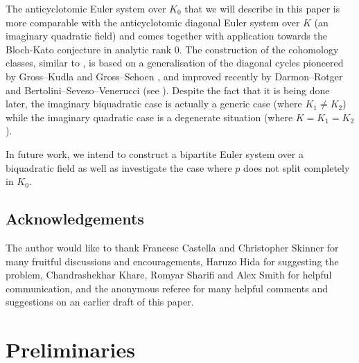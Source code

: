 \documentclass[10pt,letterpaper]{amsart}
\theoremstyle{plain}
\theoremstyle{definition}
\theoremstyle{definition}
\theoremstyle{plain}
\theoremstyle{plain}
\theoremstyle{plain}
\theoremstyle{remark}
\numberwithin{equation}{section}
\begin{document}
{The anticyclotomic Euler system over $K_0$ that we will describe in this paper is more comparable with the anticyclotomic diagonal Euler system \cite{Do-PhD,CD} over $K$ (an imaginary quadratic field) and comes together with application towards the Bloch-Kato conjecture in analytic rank $0$. The construction of the cohomology classes, similar to \cite{Do-PhD,CD}, is based on a generalisation of the diagonal cycles pioneered by Gross--Kudla \cite{gross-kudla} and Gross--Schoen \cite{gross-schoen}, and improved recently by Darmon--Rotger and Bertolini--Seveso--Venerucci (see \cite{BDRSV}). Despite the fact that it is being done later, the imaginary biquadratic case is actually a generic case (where $K_1\neq K_2$) while the imaginary quadratic case is a degenerate situation (where $K=K_1=K_2$).


In future work, we intend to construct a bipartite Euler system over a biquadratic field as well as investigate the case where $p$ does not split completely in $K_0$.  





\subsection{Acknowledgements} 
The author would like to thank Francesc Castella and Christopher Skinner for many fruitful discussions and encouragements, Haruzo Hida for suggesting the problem, Chandrashekhar Khare, Romyar Sharifi and Alex Smith for helpful communication, and the anonymous referee for many helpful comments and suggestions on an earlier
draft of this paper.







}








\section{Preliminaries}
\end{document}
